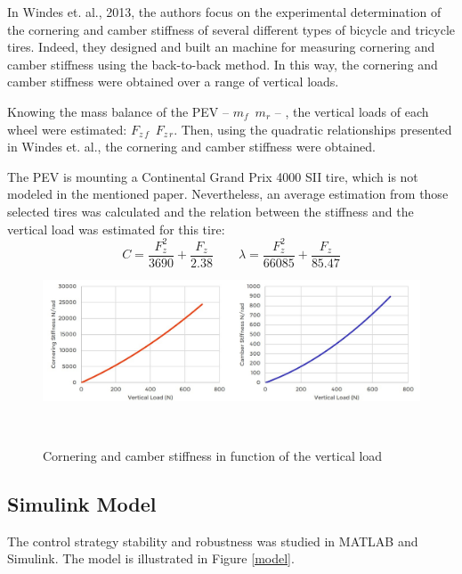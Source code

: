 In Windes et. al., 2013\cite{windes2013experimental}, the authors focus on the experimental determination of the cornering and camber stiffness of several different
types of bicycle and tricycle tires. Indeed, they designed and built an machine for measuring cornering and camber stiffness using the back-to-back method. In this way, the cornering and camber stiffness were obtained over a range of vertical loads.

Knowing the mass balance of the PEV -- $m_{f} \enspace m_{r}$ -- , the vertical loads of each wheel were estimated: $F_{z\,f} \enspace F_{z\,r}$. Then, using the quadratic relationships presented in Windes et. al., the cornering and camber stiffness were obtained.

The PEV is mounting a Continental Grand Prix 4000 SII tire, which is not modeled in the mentioned paper. Nevertheless, an average estimation from those selected tires was calculated and the relation between the stiffness and the vertical load was estimated for this tire: \[C=\frac{F_{z}^2}{3690}+\frac{F_{z}}{2.38} \quad\quad \lambda=\frac{F_{z}^2}{66085}+\frac{F_{z}}{85.47}\] 
\begin{figure}[b]
	\includegraphics[width=0.95\linewidth]{figs/06/tire}
	\caption{Cornering and camber stiffness in function of the vertical load}
	\\[-1cm]
\end{figure}
\newpage

\subsection{Simulink Model}

The control strategy stability and robustness was studied in MATLAB and Simulink. The model is illustrated in Figure \ref{model}.

